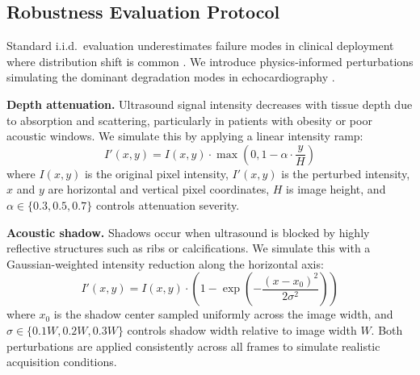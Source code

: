 \documentclass{article}
\theoremstyle{plain}
\theoremstyle{definition}
\theoremstyle{remark}
\begin{document}


\subsection{Robustness Evaluation Protocol}
\label{sec:method:robustness}

Standard i.i.d.\ evaluation underestimates failure modes in clinical deployment where distribution shift is common \citep{oakdenrayner2020hidden}. We introduce physics-informed perturbations simulating the dominant degradation modes in echocardiography \citep{tupper2025}.

\textbf{Depth attenuation.} Ultrasound signal intensity decreases with 
tissue depth due to absorption and scattering, particularly in patients 
with obesity or poor acoustic windows. We simulate this by applying a 
linear intensity ramp:
\begin{equation}
    I'(x, y) = I(x, y) \cdot \max\left(0, 1 - \alpha \cdot \frac{y}{H}\right)
\end{equation}
where $I(x,y)$ is the original pixel intensity, $I'(x,y)$ is the 
perturbed intensity, $x$ and $y$ are horizontal and vertical pixel 
coordinates, $H$ is image height, and $\alpha \in \{0.3, 0.5, 0.7\}$ 
controls attenuation severity.

\textbf{Acoustic shadow.} Shadows occur when ultrasound is blocked by 
highly reflective structures such as ribs or calcifications. We simulate 
this with a Gaussian-weighted intensity reduction along the horizontal axis:
\begin{equation}
    I'(x, y) = I(x, y) \cdot \left(1 - \exp\left(-\frac{(x - x_0)^2}{2\sigma^2}\right)\right)
\end{equation}
where $x_0$ is the shadow center sampled uniformly across the image width, 
and $\sigma \in \{0.1W, 0.2W, 0.3W\}$ controls shadow width relative to 
image width $W$. Both perturbations are applied consistently across all 
frames to simulate realistic acquisition conditions.
\end{document}
